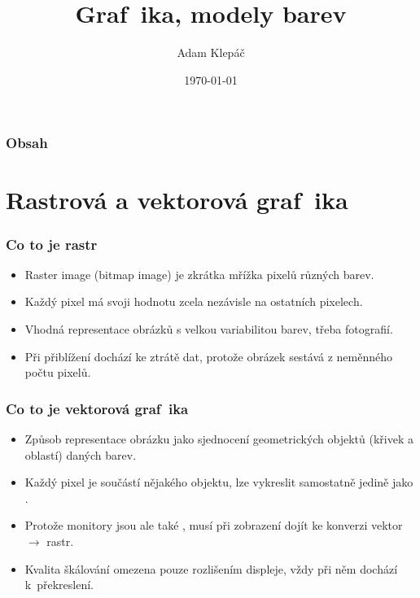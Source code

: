 \documentclass[aspectratio=169,11pt,svgnames]{beamer}
\title{Graf\!~ika, modely barev}
\date{\today}
\author{Adam Klepáč}
\institute[GEVO]{Gymnázium Evolution Jižní Město}
\begin{document}
\titleframe

\begin{frame}
\frametitle{Obsah}
\tableofcontents
\end{frame}

\section{Rastrová a vektorová graf\!~ika}
\label{sec:rastrova-a-vektorova-grafika}

\begin{frame}
\frametitle{Co to je rastr}
\begin{itemize}[label=\textbullet]
  \item Raster image (bitmap image) je zkrátka mřížka pixelů různých barev.
  \pause
  \item Každý pixel má svoji hodnotu zcela nezávisle na ostatních pixelech.
  \pause
  \item Vhodná representace obrázků s velkou variabilitou barev, třeba
    fotografií.
  \pause
  \item Při přiblížení dochází ke ztrátě dat, protože obrázek sestává z
    neměnného počtu pixelů.
\end{itemize}
\end{frame}

\begin{frame}
  \frametitle{Co to je vektorová graf\!~ika}
  \begin{itemize}[label=\textbullet]
   \item Způsob representace obrázku jako sjednocení geometrických objektů
     (křivek a oblastí) daných barev.
   \pause
   \item Každý pixel je součástí nějakého objektu, lze vykreslit samostatně
     jedině jako .
   \pause
   \item Protože monitory jsou ale také , musí při zobrazení
     dojít ke konverzi vektor $ \to $ rastr.
   \pause
   \item Kvalita škálování omezena pouze rozlišením displeje, vždy při něm
     dochází k~překreslení.
  \end{itemize}
\end{frame}
\end{document}
